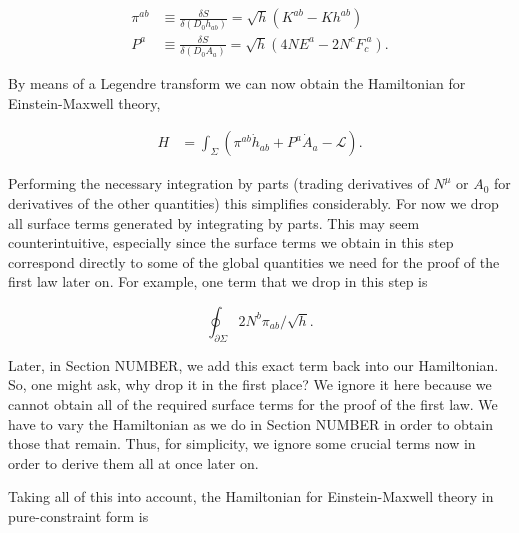 \documentclass[titlepage]{article}
\newcommand{\Lg}{\mathcal{L}}
\def\beq{\begin{equation}}
\def\eeq{\end{equation}}
\begin{document}

\beq
\begin{aligned}
\pi^{ab} &\equiv \frac{\delta S}{\delta \left(D_0 h_{ab}\right)} = \sqrt{h}\left( K^{ab} - K h^{ab} \right) \\
P^a &\equiv \frac{\delta S}{\delta \left(D_0 A_{a}\right)} = \sqrt{h} \left( 4 N E^a -2 N^c F_c^{\ a} \right).
\end{aligned}
\eeq 

\noindent
By means of a Legendre transform we can now obtain the Hamiltonian for Einstein-Maxwell theory,


\beq
\begin{aligned}
H &= \int_\Sigma \left( \pi^{ab} \dot{h}_{ab} + P^a \dot{A}_a - \Lg \right) .
\end{aligned}
\eeq

Performing the necessary integration by parts (trading derivatives of $N^\mu$ or $A_0$ for derivatives of the other quantities) this simplifies considerably.  For now we drop all surface terms generated by integrating by parts.  This may seem counterintuitive, especially since the surface terms we obtain in this step correspond directly to some of the global quantities we need for the proof of the first law later on. For example, one term that we drop in this step is 

\beq
\oint_{\partial \Sigma} 2N^b\pi_{ab}/\sqrt{h}.
\eeq

\noindent
Later, in Section NUMBER, we add this exact term back into our Hamiltonian.  So, one might ask, why drop it in the first place?  We ignore it here because we cannot obtain all of the required surface terms for the proof of the first law. We have to vary the Hamiltonian as we do in Section NUMBER in order to obtain those that remain. Thus, for simplicity, we ignore some crucial terms now in order to derive them all at once later on.

Taking all of this into account, the Hamiltonian for Einstein-Maxwell theory in pure-constraint form is 
\end{document}
